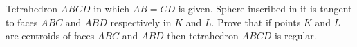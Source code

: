 Tetrahedron $ABCD$ in which $AB=CD$ is given. Sphere inscribed in it is tangent to faces $ABC$ and $ABD$ respectively in $K$ and $L$. Prove that if points $K$ and $L$ are centroids of faces $ABC$ and $ABD$ then tetrahedron $ABCD$ is regular.
